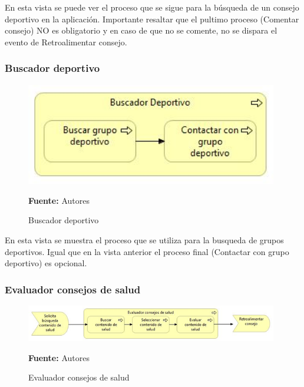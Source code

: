 En esta vista se puede ver el proceso que se sigue para la búsqueda de un consejo deportivo en la aplicación. Importante resaltar que el pultimo proceso (Comentar consejo) NO es obligatorio y en caso de que no se comente, no se dispara el evento de Retroalimentar consejo.

\subsubsection{Buscador deportivo}

\begin{figure}[!htb]
  \begin{center}
    \includegraphics[width=11cm]{./imagenes/Archimate/vistas/business_process/buscadordeportivo.png}
    \caption{Buscador deportivo}
    \label{fig:BP_BuscadorDeportivo}
    \textbf{Fuente:}  Autores
  \end{center}
\end{figure}

En esta vista se muestra el proceso que se utiliza para la busqueda de grupos deportivos. Igual que en la vista anterior el proceso final (Contactar con grupo deportivo) es opcional.

\subsubsection{Evaluador consejos de salud}

\begin{figure}[!htb]
  \begin{center}
    \includegraphics[width=11cm]{./imagenes/Archimate/vistas/business_process/evaluadorconsejossalud.png}
    \caption{Evaluador consejos de salud}
    \label{fig:BP_EvaluadorConsejosSalud}
    \textbf{Fuente:}  Autores
  \end{center}
\end{figure}

